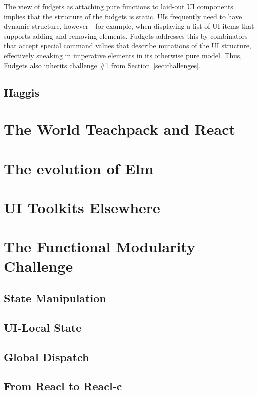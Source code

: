 \documentclass[sigplan,screen]{acmart}
\begin{document}
The view of fudgets as attaching pure functions to laid-out UI
components implies that the structure of the fudgets is static.  UIs
frequently need to have dynamic structure, however---for example, when
displaying a list of UI items that supports adding and removing
elements.  Fudgets addresses this by combinators that accept special
command values that describe mutations of the UI structure,
effectively sneaking in imperative elements in its otherwise pure
model.  Thus, Fudgets also inherits challenge \#1 from
Section~\ref{sec:challenges}.

\subsection{Haggis}

\section{The World Teachpack and React} 

\section{The evolution of Elm}

\section{UI Toolkits Elsewhere}

\section{The Functional Modularity Challenge}

\subsection{State Manipulation}

\subsection{UI-Local State}

\subsection{Global Dispatch}

\subsection{From Reacl to Reacl-c}
\end{document}

